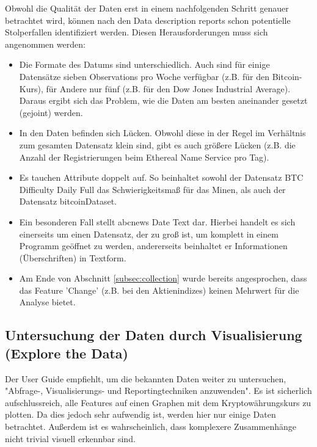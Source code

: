 Obwohl die Qualität der Daten erst in einem nachfolgenden Schritt genauer betrachtet wird, können nach den Data description reports schon potentielle Stolperfallen identifiziert werden. Diesen Herausforderungen muss sich angenommen werden:
\begin{itemize}
\item Die Formate des Datums sind unterschiedlich. Auch sind für einige Datensätze sieben Observations pro Woche verfügbar (z.B. für den Bitcoin-Kurs), für Andere nur fünf (z.B. für den Dow Jones Industrial Average). Daraus ergibt sich das Problem, wie die Daten am besten aneinander gesetzt (gejoint) werden.
\item In den Daten befinden sich Lücken. Obwohl diese in der Regel im Verhältnis zum gesamten Datensatz klein sind, gibt es auch größere Lücken (z.B. die Anzahl der Registrierungen beim Ethereal Name Service pro Tag).
\item Es tauchen Attribute doppelt auf. So beinhaltet sowohl der Datensatz BTC \textunderscore Difficulty \textunderscore Daily \textunderscore Full das Schwierigkeitsmaß für das Minen, als auch der Datensatz bitcoinDataset. 
\item Ein besonderen Fall stellt abcnews \textunderscore Date \textunderscore Text dar. Hierbei handelt es sich einerseits um einen Datensatz, der zu groß ist, um komplett in einem Programm geöffnet zu werden, andererseits beinhaltet er Informationen (Überschriften) in Textform.
\item Am Ende von Abschnitt \ref{subsec:collection} wurde bereits angesprochen, dass das Feature 'Change' (z.B. bei den Aktienindizes) keinen Mehrwert für die Analyse bietet.
\end{itemize}

\subsection{Untersuchung der Daten durch Visualisierung (Explore the Data)} \label{subsec:explore}
Der User Guide empfiehlt, um die bekannten Daten weiter zu untersuchen, "Abfrage-, Visualisierungs- und Reportingtechniken anzuwenden"\citep[S.~40; eigene Übersetzung]{chapman_crisp-dm_2000}. Es ist sicherlich aufschlussreich, alle Features auf einen Graphen mit dem Kryptowährungskurs zu plotten. Da dies jedoch sehr aufwendig ist, werden hier nur einige Daten betrachtet. Außerdem ist es wahrscheinlich, dass komplexere Zusammenhänge nicht trivial visuell erkennbar sind.\newline

